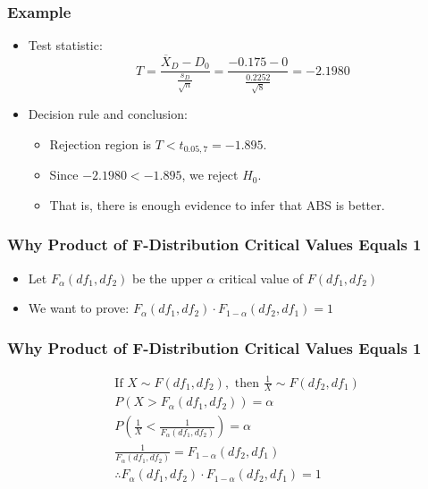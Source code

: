 \documentclass[12pt]{beamer}
\begin{document}
	\begin{frame}
		\frametitle{Example}
		
		\begin{itemize}[label={\color{blue}$\blacktriangleright$}]
			\item Test statistic:
			\[
			T = \frac{\overline{X}_D - D_0}{\frac{s_D}{\sqrt{n}}} = \frac{-0.175 - 0}{\frac{0.2252}{\sqrt{8}}} = -2.1980
			\]
			
			\item Decision rule and conclusion:
			\begin{itemize}[label={\color{blue}$\blacktriangleright$}]
				\item Rejection region is $T < t_{0.05,7} = -1.895$.
				\item Since $-2.1980 < -1.895$, we reject $H_0$.
				\item That is, there is enough evidence to infer that ABS is better.
			\end{itemize}
		\end{itemize}
		
	\end{frame}
	\begin{frame}
		\frametitle{Why Product of F-Distribution Critical Values Equals 1}
		
		\begin{itemize}[label={\color{blue}$\blacktriangleright$}]
			\item Let $F_\alpha(df_1, df_2)$ be the upper $\alpha$ critical value of $F(df_1, df_2)$
			\item We want to prove: $F_\alpha(df_1, df_2) \cdot F_{1-\alpha}(df_2, df_1) = 1$
		\end{itemize}
			\end{frame}
	\begin{frame}
	\frametitle{Why Product of F-Distribution Critical Values Equals 1}
			\begin{align*}
				&\text{If } X \sim F(df_1, df_2), \text{ then } \frac{1}{X} \sim F(df_2, df_1) \\[1ex]
				&P(X > F_\alpha(df_1, df_2)) = \alpha \\[1ex]
				&P\left(\frac{1}{X} < \frac{1}{F_\alpha(df_1, df_2)}\right) = \alpha \\[1ex]
				&\frac{1}{F_\alpha(df_1, df_2)} = F_{1-\alpha}(df_2, df_1) \\[1ex]
				&\therefore F_\alpha(df_1, df_2) \cdot F_{1-\alpha}(df_2, df_1) = 1
			\end{align*}
		
	\end{frame}
	
\end{document}
